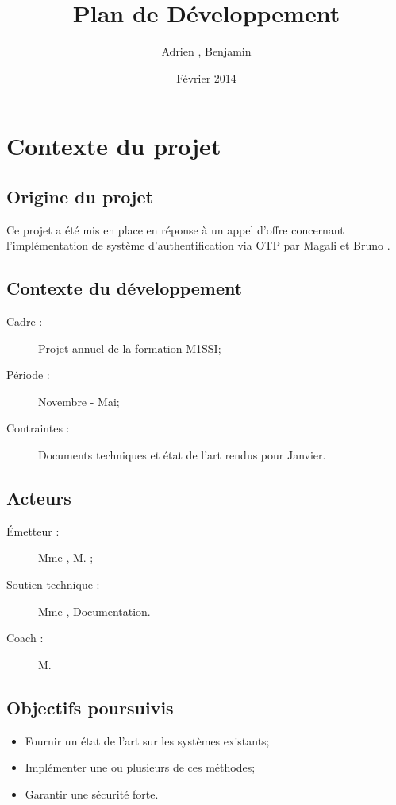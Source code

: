 \documentclass{../../res/univ-projet}
\title{Plan de Développement}
\author{Adrien \bsc{Smondack}, Benjamin \bsc{Zigh}}
\date{Février 2014}
\begin{document}
\maketitle

\section{Contexte du projet}
\subsection{Origine du projet}
	Ce projet a été mis en place en réponse à un appel d'offre concernant l'implémentation de système d'authentification via OTP par Magali  et Bruno .
	
\subsection{Contexte du développement}
	\begin{description} 
		\item [Cadre :] Projet annuel de la formation M1SSI;
		\item [Période :] Novembre - Mai;
		\item [Contraintes :] Documents techniques et état de l'art rendus pour Janvier.
	\end{description}

\subsection{Acteurs}
	\begin{description}
		\item [Émetteur :] Mme , M. ;
		\item [Soutien technique :] Mme , Documentation.
		\item [Coach :] M. 
	\end{description}

\subsection{Objectifs poursuivis}
	\begin{itemize}
		\item Fournir un état de l'art sur les systèmes existants;
		\item Implémenter une ou plusieurs de ces méthodes;
		\item Garantir une sécurité forte.
	\end{itemize}
\end{document}
